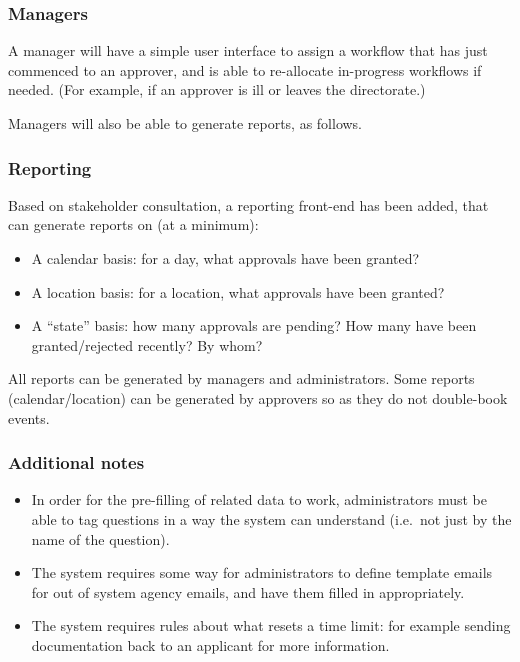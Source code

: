 \documentclass[12pt,a4paper,twosided]{article}
\begin{document}
\subsubsection{Managers}

A manager will have a simple user interface to assign a workflow that
has just commenced to an approver, and is able to re-allocate
in-progress workflows if needed. (For example, if an approver is ill or
leaves the directorate.)

Managers will also be able to generate reports, as follows.

\subsubsection{Reporting}

Based on stakeholder consultation, a reporting front-end has been added,
that can generate reports on (at a minimum):

\begin{itemize}
\itemsep1pt\parskip0pt
\item
  A calendar basis: for a day, what approvals have been granted?
\item
  A location basis: for a location, what approvals have been granted?
\item
  A ``state'' basis: how many approvals are pending? How many have been
  granted/rejected recently? By whom?
\end{itemize}

All reports can be generated by managers and administrators. Some
reports (calendar/location) can be generated by approvers so as they do
not double-book events.

\subsubsection{Additional notes}

\begin{itemize}
\item
  In order for the pre-filling of related data to work, administrators
  must be able to tag questions in a way the system can understand
  (i.e.~not just by the name of the question).
\item
  The system requires some way for administrators to define template
  emails for out of system agency emails, and have them filled in
  appropriately.
\item
  The system requires rules about what resets a time limit: for example
  sending documentation back to an applicant for more information.
\end{itemize}
\end{document}
